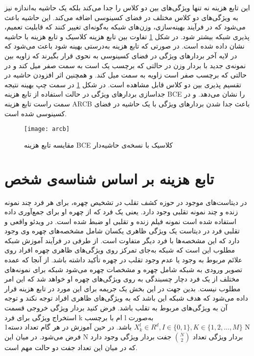 این تابع هزینه نه تنها ویژگی‌های بین دو کلاس را جدا می‌کند بلکه یک حاشیه به‌اندازه  نیز به ویژگی‌های دو کلاس مختلف در فضای کسینوسی اضافه می‌کند. این حاشیه باعث می‌شود که در فرآیند بهینه‌سازی، وزن‌های شبکه به‌گونه‌ای تغییر کنند که قابلیت تعمیم، پذیری شبکه بیشتر شود.
در شکل
\ref{fig:arcb}
تفاوت بین تابع هزینه کلاسیک و تابع هزینه با حاشیه نشان داده شده است. در صورتی که تابع هزینه به‌درستی بهینه شود باعث می‌شود که در لایه آخر بردارهای ویژگی در فضای کسینوسی به نحوی قرار بگیرند که زاویه بین نمونه‌ی جدید با بردار وزن در حالتی که برچسب یک است به سمت صفر میل کند و در حالتی که برچسب صفر است زاویه به سمت  میل کند. و همچنین اثر افزودن حاشیه در تقسیم پذیری بین دو کلاس قابل مشاهده است. در شکل
\ref{fig:arcb}
در سمت چپ بهینه نتیجه جداسازی بردارهای ویژگی در حالت استفاده از تابع هزینه BCE را نشان می‌دهد. و در سمت راست تابع هزینه ARCB باعث جدا شدن بردارهای ویژگی با یک حاشیه در فضای کسینوسی شده است. 

\begin{figure}[ht]
	\centerline{\texttt{[image: arcb]}}
	\caption{مقایسه تابع هزینه BCE کلاسیک با نسخه‌ی حاشیه‌دار }
	\label{fig:arcb}
\end{figure}

\section{تابع هزینه بر اساس شناسه‌ی شخص}
در دیتاست‌های موجود در حوزه کشف تقلب در تشخیص چهره، برای هر فرد چند نمونه زنده و چند نمونه تقلبی وجود دارد. یعنی یک فرد که از چهره او برای جمع‌آوری داده استفاده شده است نمونه فیلم زنده و تقلبی او ضبط شده است. در ویدئو واقعی و تقلبی فرد در دیتاست یک ویژگی ظاهری یکسان شامل مشخصه‌های چهره وی وجود دارد که این مشخصه‌ها با فرد دیگر متفاوت است. از طرفی در فرآیند آموزش شبکه مطلوب این است که شبکه به‌جای تمرکز روی ویژگی‌های ظاهری چهره افراد روی علائم مربوط به وجود یا عدم وجود تقلب در چهره تأکید داشته باشد.
از آنجا که عمده تصویر ورودی به شبکه شامل چهره و مشخصات چهره می‌شود شبکه برای نمونه‌های مختلف از یک فرد دچار چسبندگی به روی ویژگی‌های چهره او خواهد شد که این امر مطلوب نیست.       
بدین جهت در این بخش یک جریمه برای این مورد در تابع هزینه قرار داده می‌شود که هدف شبکه این باشد که به ویژگی‌های ظاهری افراد توجه نکند و توجه آن به ویژگی‌های مربوط به تقلب باشد. فرض کنید بردار ویژگی خروجی قسمت استخراج ویژگی برای فرد k ام با برچسب l به‌صورت 
$X_k^l \in R^d , I \in \{0,1\}, K \in \{1,2,...,M\}$
 باشد.
در حین آموزش در هر گام تعداد دسته1 N فرض می‌شود. در میان این N بردار ویژگی تعداد 
${N\choose 2}$
  جفت بردار ویژگی وجود دارد که در میان این تعداد جفت دو حالت مهم است.
  
